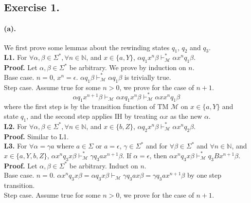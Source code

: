 \documentclass[12pt]{article}
\begin{document}
\subsection*{Exercise 1.}
\paragraph*{(a).} We first prove some lemmas about the rewinding states \(q_1\), \(q_2\) and \(q_3\).\\
\textbf{L1.} For \(\forall \alpha, \beta \in \Sigma^*, \forall n \in \mathbb{N}\), and \(x \in \{a, Y\}\), \(\alpha q_1x^n\beta \vdash^{*}_{\mathcal{M}} \alpha x^nq_1\beta\).\\
\textbf{Proof.} Let \(\alpha, \beta \in \Sigma^*\) be arbitrary. We prove by induction on \(n\). \\ 
Base case. \(n = 0\), \(x^n = \epsilon\). \(\alpha q_1 \beta \vdash^{*}_{\mathcal{M}} \alpha q_1 \beta\) is trivially true.\\ 
Step case. Assume true for some \(n > 0\), we prove for the case of \(n+1\). 
\begin{equation*}
  \alpha q_1x^{n+1}\beta \vdash_{\mathcal{M}} \alpha xq_1x^n\beta \vdash^*_\mathcal{M} \alpha x x^n q_1\beta
\end{equation*}
where the first step is by the transition function of TM \(\mathcal{M}\) on \(x \in \{a, Y\}\) and state \(q_1\), and the second step applies IH by treating \(\alpha x\) as the new \(\alpha\).\\
\textbf{L2.} For \(\forall \alpha, \beta \in \Sigma^*, \forall n \in \mathbb{N}\), and \(x \in \{b, Z\}\), \(\alpha q_2x^n\beta \vdash^*_\mathcal{M} \alpha x^nq_2\beta\).\\
\textbf{Proof.} Similar to L1.\\
\textbf{L3.} For \(\forall \alpha = \gamma a\) where \(a \in \Sigma\) or \(a = \epsilon\), \(\gamma \in \Sigma^*\) and for \(\forall \beta \in \Sigma^*\) and \(\forall n \in \mathbb{N}\), and \(x \in \{a, Y, b, Z\}\), \(\alpha x^nq_3x\beta \vdash^{*}_{\mathcal{M}} \gamma q_3a x^{n+1}\beta\). If \(\alpha = \epsilon\), then \(\alpha x^nq_3x\beta \vdash^{*}_{\mathcal{M}} q_3B x^{n+1}\beta\).\\
\textbf{Proof.} Let \(\alpha, \beta \in \Sigma^*\) be arbitrary. Induct on \(n\).\\
Base case. \(n = 0\).  \(\alpha x^nq_3x\beta = \alpha q_3x\beta \vdash_\mathcal{M}\gamma q_3ax\beta = \gamma q_3a x^{n+1}\beta\) by one step transition.\\
Step case. Assume true for some \(n > 0\), we prove for the case of \(n+1\). \\
\end{document}

